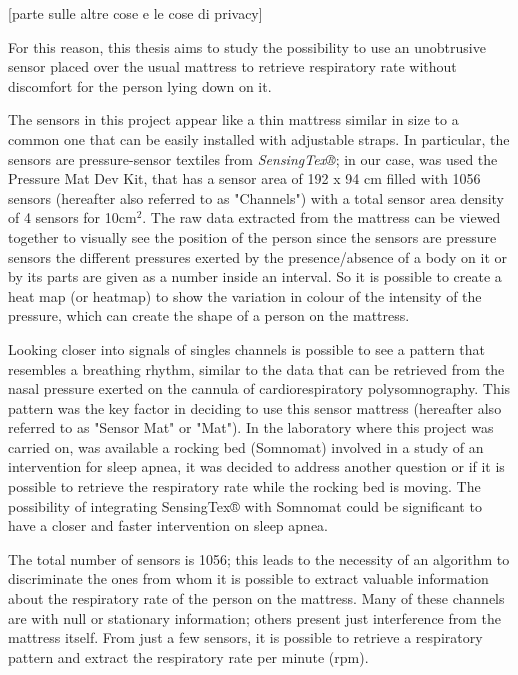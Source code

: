 \documentclass[a4paper,11pt, oneside,italian]{article}
\begin{document}
[parte sulle altre cose e le cose di privacy]



For this reason, this thesis aims to study the possibility to use an unobtrusive sensor placed over the usual mattress to retrieve 
respiratory rate without discomfort for the person lying down on it. 


The sensors in this project appear like a thin mattress similar in size to a common one that can be easily installed with adjustable straps.
In particular, the sensors are pressure-sensor textiles from \textit{SensingTex®}; in our case, was used the Pressure Mat Dev Kit,
 that has a sensor area of 192 x 94 cm filled with 1056 sensors (hereafter also referred to as "Channels") 
 with a total sensor area density of 4 sensors for 10cm$^2$.
 The raw data extracted from the mattress can be viewed together to visually see the position of the person since the sensors are pressure sensors
the different pressures exerted by the presence/absence of a body on it or by its parts are given as a number inside an interval. 
So it is possible to create a heat map (or heatmap) to show the variation in colour of the intensity of the pressure, which can create the shape of
a person on the mattress.

Looking closer into signals of singles channels is possible to see a pattern that resembles a breathing rhythm,  similar to the data that can
 be retrieved from the nasal pressure exerted on the cannula of cardiorespiratory polysomnography.
This pattern was the key factor in deciding to use this sensor mattress (hereafter also referred to as "Sensor Mat" or "Mat"). 
In the laboratory where this project was carried on, was available a rocking bed (Somnomat) involved in a study of an intervention for 
sleep apnea, it was decided to address another question or if it is possible to retrieve the respiratory rate while the rocking bed is moving.
The possibility of integrating SensingTex® with Somnomat could be significant to have a closer and faster intervention on sleep apnea.


The total number of sensors is 1056; this leads to the necessity of an algorithm to discriminate the ones from whom 
it is possible to extract valuable information about the respiratory rate of the person on the mattress.
Many of these channels are with null or stationary information; others present just interference from the 
mattress itself. From just a few sensors, it is possible to retrieve a respiratory pattern and extract the 
respiratory rate per minute (rpm). 
\end{document}
